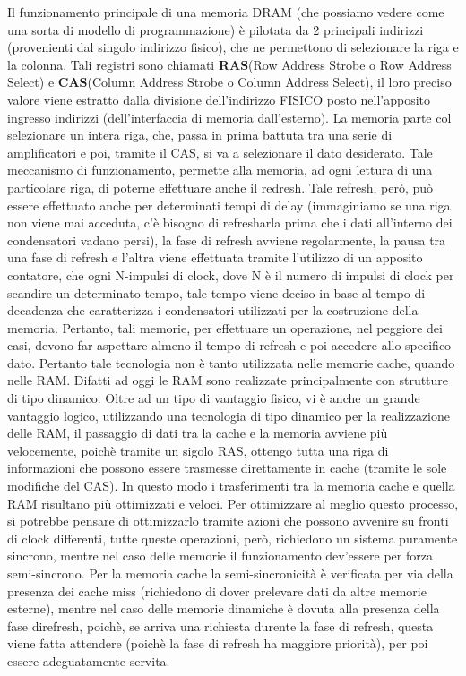 Il funzionamento principale di una memoria DRAM (che possiamo vedere come una sorta di modello di programmazione) è pilotata da 2 principali indirizzi (provenienti dal singolo indirizzo fisico), che ne permettono di selezionare la riga e la colonna. 
Tali registri sono chiamati \textbf{RAS}(Row Address Strobe o Row Address Select) e \textbf{CAS}(Column Address Strobe o Column Address Select), il loro preciso valore viene estratto dalla divisione dell'indirizzo FISICO posto nell'apposito ingresso indirizzi (dell'interfaccia di memoria dall'esterno). La memoria parte col selezionare un intera riga, che, passa in prima battuta tra una serie di amplificatori e poi, tramite il CAS, si va a selezionare il dato desiderato. Tale meccanismo di funzionamento, permette alla memoria, ad ogni lettura di una particolare riga, di poterne effettuare anche il redresh. Tale refresh, però, può essere effettuato anche per determinati tempi di delay (immaginiamo se una riga non viene mai acceduta, c'è bisogno di refresharla prima che i dati all'interno dei condensatori vadano persi), la fase di refresh avviene regolarmente, la pausa tra una fase di refresh e l'altra viene effettuata tramite l'utilizzo di un apposito contatore, che ogni N-impulsi di clock, dove N è il numero di impulsi di clock per scandire un determinato tempo, tale tempo viene deciso in base al tempo di decadenza che caratterizza i condensatori utilizzati per la costruzione della memoria. Pertanto, tali memorie, per effettuare un operazione, nel peggiore dei casi, devono far aspettare almeno il tempo di refresh e poi accedere allo specifico dato. Pertanto tale tecnologia non è tanto utilizzata nelle memorie cache, quando nelle RAM. Difatti ad oggi le RAM sono realizzate principalmente con strutture di tipo dinamico.
Oltre ad un tipo di vantaggio fisico, vi è anche un grande vantaggio logico, utilizzando una tecnologia di tipo dinamico per la realizzazione delle RAM, il passaggio di dati tra la cache e la memoria avviene più velocemente, poichè tramite un sigolo RAS, ottengo tutta una riga di informazioni che possono essere trasmesse direttamente in cache (tramite le sole modifiche del CAS). In questo modo i trasferimenti tra la memoria cache e quella RAM risultano più ottimizzati e veloci.
Per ottimizzare al meglio questo processo, si potrebbe pensare di ottimizzarlo tramite azioni che possono avvenire su fronti di clock differenti, tutte queste operazioni, però, richiedono un sistema puramente sincrono, mentre nel caso delle memorie il funzionamento dev'essere per forza semi-sincrono. Per la memoria cache la semi-sincronicità è verificata per via della presenza dei cache miss (richiedono di dover prelevare dati da altre memorie esterne), mentre nel caso delle memorie dinamiche è dovuta alla presenza della fase direfresh, poichè, se arriva una richiesta durente la fase di refresh, questa viene fatta attendere (poichè la fase di refresh ha maggiore priorità), per poi essere adeguatamente servita. 

